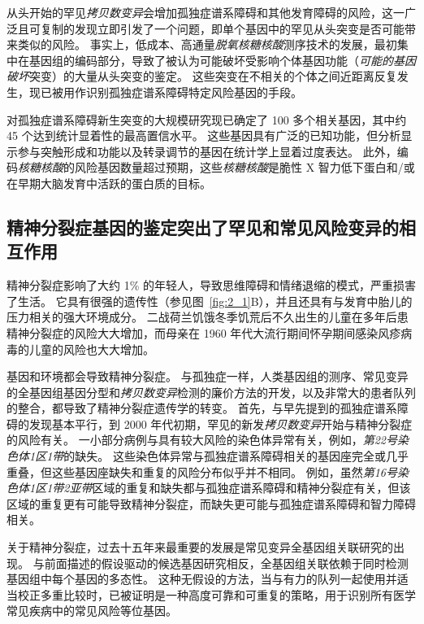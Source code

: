 从头开始的罕见\textit{拷贝数变异}会增加孤独症谱系障碍和其他发育障碍的风险，这一广泛且可复制的发现立即引发了一个问题，即单个基因中的罕见从头突变是否可能带来类似的风险。
事实上，低成本、高通量\textit{脱氧核糖核酸}测序技术的发展，最初集中在基因组的编码部分，导致了被认为可能破坏受影响个体基因功能（\textit{可能的基因破坏}突变）的大量从头突变的鉴定。
这些突变在不相关的个体之间近距离反复发生，现已被用作识别孤独症谱系障碍特定风险基因的手段。


对孤独症谱系障碍新生突变的大规模研究现已确定了 100 多个相关基因，其中约 45 个达到统计显着性的最高置信水平。
这些基因具有广泛的已知功能，但分析显示参与突触形成和功能以及转录调节的基因在统计学上显着过度表达。
此外，编码\textit{核糖核酸}的风险基因数量超过预期，这些\textit{核糖核酸}是脆性 X 智力低下蛋白和/或在早期大脑发育中活跃的蛋白质的目标。



\subsection{精神分裂症基因的鉴定突出了罕见和常见风险变异的相互作用}

精神分裂症影响了大约 1\% 的年轻人，导致思维障碍和情绪退缩的模式，严重损害了生活。
它具有很强的遗传性（参见图~\ref{fig:2_1}B），并且还具有与发育中胎儿的压力相关的强大环境成分。
二战荷兰饥饿冬季饥荒后不久出生的儿童在多年后患精神分裂症的风险大大增加，而母亲在 1960 年代大流行期间怀孕期间感染风疹病毒的儿童的风险也大大增加。


基因和环境都会导致精神分裂症。
与孤独症一样，人类基因组的测序、常见变异的全基因组基因分型和\textit{拷贝数变异}检测的廉价方法的开发，以及非常大的患者队列的整合，都导致了精神分裂症遗传学的转变。
首先，与早先提到的孤独症谱系障碍的发现基本平行，到 2000 年代初期，罕见的新发\textit{拷贝数变异}开始与精神分裂症的风险有关。
一小部分病例与具有较大风险的染色体异常有关，例如，\textit{第22号染色体1区1带}的缺失。
这些染色体异常与孤独症谱系障碍相关的基因座完全或几乎重叠，但这些基因座缺失和重复的风险分布似乎并不相同。
例如，虽然\textit{第16号染色体1区1带2亚带}区域的重复和缺失都与孤独症谱系障碍和精神分裂症有关，但该区域的重复更有可能导致精神分裂症，而缺失更可能与孤独症谱系障碍和智力障碍相关。


关于精神分裂症，过去十五年来最重要的发展是常见变异全基因组关联研究的出现。
与前面描述的假设驱动的候选基因研究相反，全基因组关联依赖于同时检测基因组中每个基因的多态性。
这种无假设的方法，当与有力的队列一起使用并适当校正多重比较时，已被证明是一种高度可靠和可重复的策略，用于识别所有医学常见疾病中的常见风险等位基因。


